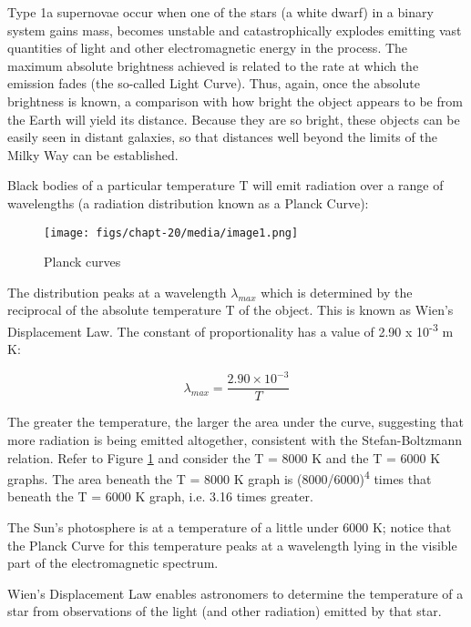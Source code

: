\documentclass[revision-guide.tex]{subfiles}
\begin{document}
Type 1a supernovae occur when one of the stars (a white dwarf) in a
binary system gains mass, becomes unstable and catastrophically explodes
emitting vast quantities of light and other electromagnetic energy in
the process. The maximum absolute brightness achieved is related to the
rate at which the emission fades (the so-called Light Curve). Thus,
again, once the absolute brightness is known, a comparison with how
bright the object appears to be from the Earth will yield its distance.
Because they are so bright, these objects can be easily seen in distant
galaxies, so that distances well beyond the limits of the Milky Way can
be established.

Black bodies of a particular temperature T will emit radiation over a
range of wavelengths (a radiation distribution known as a Planck Curve):

\begin{figure}[h]
\texttt{[image: figs/chapt-20/media/image1.png]}
\caption{Planck curves}
\label{plank-curves}
\end{figure}

The distribution peaks at a wavelength $\lambda_{max}$ which is
determined by the reciprocal of the absolute temperature T of the
object. This is known as Wien's Displacement Law. The constant of
proportionality has a value of 2.90 x 10\textsuperscript{-3} m K:

\[\lambda_{max} = \frac{2.90 \times 10^{-3}} {T}\]

The greater the temperature, the larger the area under the curve,
suggesting that more radiation is being emitted altogether, consistent
with the Stefan-Boltzmann relation. Refer to Figure \ref{plank-curves} and consider the T
= 8000 K and the T = 6000 K graphs. The area beneath the T = 8000 K
graph is (8000/6000)\textsuperscript{4} times that beneath the T = 6000
K graph, i.e. 3.16 times greater.

The Sun's photosphere is at a temperature of a little under 6000 K;
notice that the Planck Curve for this temperature peaks at a wavelength
lying in the visible part of the electromagnetic spectrum.

Wien's Displacement Law enables astronomers to determine the temperature
of a star from observations of the light (and other radiation) emitted
by that star.
\end{document}
